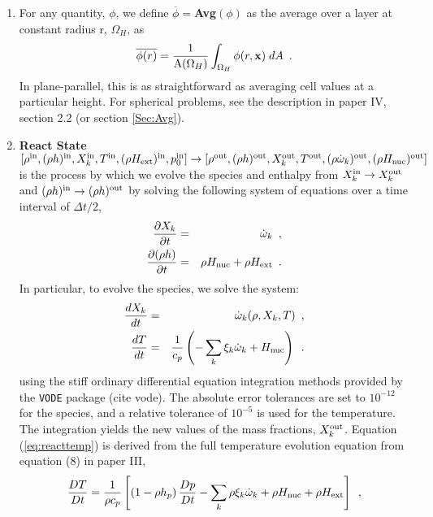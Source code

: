 \begin{enumerate}

\item For any quantity, $\phi$, we define $\overline{\phi} = ${\bf Avg}$(\phi)$
as the average over a layer at constant radius r, $\Omega_H$, as
\begin{equation}
\overline{\phi(r)}
= \frac{1}{\mathrm{A}(\Omega_H)}\int_{\Omega_H} \phi(r,{\bf x}) \; dA \enskip .
\end{equation}
In plane-parallel, this is as straightforward as averaging cell values at 
a particular height.  For spherical problems, see the description in 
paper IV, section 2.2 (or section \ref{Sec:Avg}).

\item {\bf React State}$[\rho^{\mathrm{in}},(\rho h)^{\mathrm{in}},X_k^{\mathrm{in}},T^{\mathrm{in}}, (\rho{H_{\rm ext}})^{\mathrm{in}}, 
p_0^{\mathrm{in}}]\rightarrow [\rho^{\mathrm{out}}, (\rho h)^{\mathrm{out}}, X_k^{\mathrm{out}}, T^{\mathrm{out}}, 
(\rho \dot{\omega}_k)^{\mathrm{out}}, (\rho{H_{\rm nuc}})^{\mathrm{out}}]$
is the process by which we evolve the species and enthalpy from 
$X_k^{\mathrm{in}} \rightarrow X_k^{\mathrm{out}}$ 
and $(\rho h)^{\mathrm{in}} \rightarrow (\rho h)^{\mathrm{out}}$ by solving the following 
system of equations over a time interval of  $\Delta t/2$,
\begin{eqnarray}
\frac{\partial X_k}{\partial t} &=& \dot{\omega}_k\enskip,\\
\frac{\partial (\rho h)}{\partial t} &=& \rho {H_{\rm nuc}} + \rho {H_{\rm ext}}\enskip .
\end{eqnarray}
  In particular, to evolve the species, we solve the system:
\begin{eqnarray}
\frac{dX_k}{dt} &=& \dot{\omega}_k(\rho,X_k,T)\enskip, \\
\frac{dT}{dt} &=&\frac{1}{c_p} \left ( -\sum_k \xi_k  \dot{\omega}_k  + {H_{\rm nuc}} \right )
\enskip. \label{eq:reacttemp}
\end{eqnarray}
using the stiff ordinary differential equation integration methods
provided by the {\tt VODE} package (cite vode).  The absolute error
tolerances are set to $10^{-12}$ for the species, and a relative
tolerance of $10^{-5}$ is used for the temperature.  The integration
yields the new values of the mass fractions, $X_k^{\mathrm{out}}$.  Equation
(\ref{eq:reacttemp}) is derived from the full temperature evolution equation
from equation (8) in paper III,
\begin{equation}
\label{eq:tempenthalpy}
\frac{DT}{Dt} = \frac{1}{\rho c_p} \left[ \left(1 - \rho h_p\right) \frac{D p}{D t}
 - \sum_k \rho \xi_k {\dot{\omega}}_k 
 + \rho {H_{\rm nuc}} + \rho {H_{\rm ext}} \right] \enskip , 
\end{equation}

\end{enumerate}

